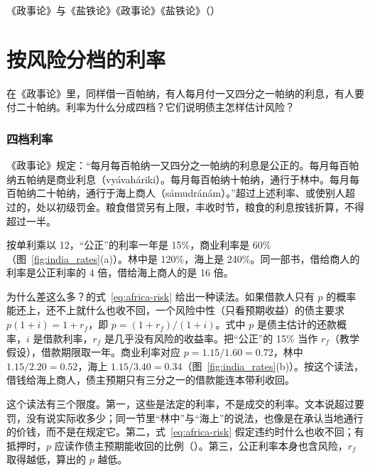 \begin{compare}{《政事论》与《盐铁论》}{《政事论》}{《盐铁论》（）}
\end{compare}

\section{按风险分档的利率}\label{sec:india-interest}

在《政事论》里，同样借一百帕纳，有人每月付一又四分之一帕纳的利息，有人要付二十帕纳。利率为什么分成四档？它们说明债主怎样估计风险？

\subsubsection{四档利率}
《政事论》规定：“每月每百帕纳一又四分之一帕纳的利息是公正的。每月每百帕纳五帕纳是商业利息（vyávaháriki）。每月每百帕纳十帕纳，通行于林中。每月每百帕纳二十帕纳，通行于海上商人（sámudránám）。”\cite{arthashastra}超过上述利率、或使别人超过的，处以初级罚金。粮食借贷另有上限，丰收时节，粮食的利息按钱折算，不得超过一半\cite{arthashastra}。

按单利乘以 12，“公正”的利率一年是 15\%，商业利率是 60\%（图~\ref{fig:india_rates}(a)）。林中是 120\%，海上是 240\%。同一部书，借给商人的利率是公正利率的 4 倍，借给海上商人的是 16 倍。

为什么差这么多？的式~\eqref{eq:africa-risk} 给出一种读法。如果借款人只有 $p$ 的概率能还上，还不上就什么也收不回，一个风险中性（只看预期收益）的债主要求 $p(1+i)=1+r_f$，即 $p=(1+r_f)/(1+i)$。式中 $p$ 是债主估计的还款概率，$i$ 是借款利率，$r_f$ 是几乎没有风险的收益率。把“公正”的 15\% 当作 $r_f$（教学假设），借款期限取一年。商业利率对应 $p=1.15/1.60=0.72$，林中 $1.15/2.20=0.52$，海上 $1.15/3.40=0.34$（图~\ref{fig:india_rates}(b)）。按这个读法，借钱给海上商人，债主预期只有三分之一的借款能连本带利收回。

这个读法有三个限度。第一，这些是法定的利率，不是成交的利率。文本说超过要罚，没有说实际收多少；同一节里“林中”与“海上”的说法，也像是在承认当地通行的价钱，而不是在规定它。第二，式~\eqref{eq:africa-risk} 假定违约时什么也收不回；有抵押时，$p$ 应读作债主预期能收回的比例（）。第三，公正利率本身也含风险，$r_f$ 取得越低，算出的 $p$ 越低。

